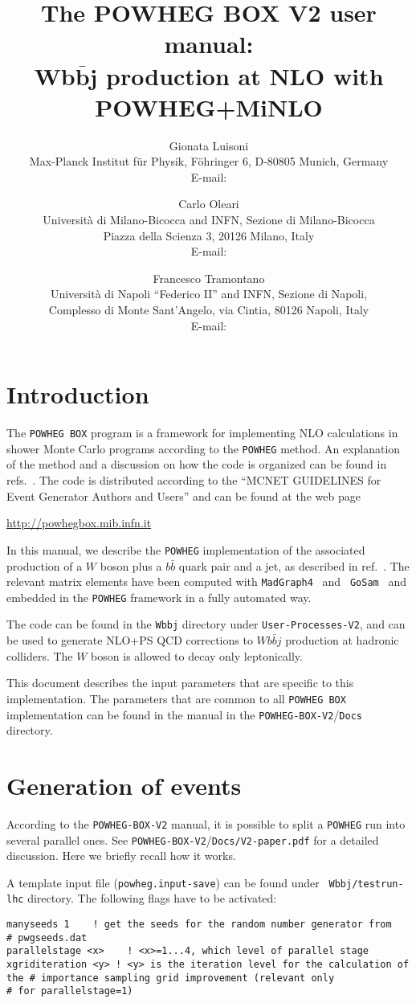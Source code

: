 \documentclass[paper]{JHEP3}
\title{The POWHEG BOX V2 user manual:\\
  $\boldsymbol{Wb\bar{b}j}$ production at NLO with POWHEG+MiNLO} \vfill
\author{Gionata Luisoni\\ 
  Max-Planck Institut f{\"u}r Physik, F\"ohringer 6, D-80805 Munich, Germany\\
  E-mail: \email{luisonig@mpp.mpg.de}
}
\author{Carlo Oleari\\
  Universit\`a di Milano-Bicocca and INFN, Sezione di Milano-Bicocca\\
  Piazza della Scienza 3, 20126 Milano, Italy\\
  E-mail: \email{carlo.oleari@mib.infn.it}}
\author{Francesco Tramontano\\
  Universit\`a di Napoli ``Federico II'' and INFN, Sezione di Napoli,\\
  Complesso di Monte Sant'Angelo, via Cintia, 80126 Napoli, Italy\\
  E-mail: \email{francesco.tramontano@na.infn.it}
}
\newcommand\POWHEG{{\tt POWHEG}}
\newcommand\POWHEGBOX{{\tt POWHEG BOX}}
\newcommand\POWHEGBOXV{{\tt POWHEG-BOX-V2}}
\newcommand\Wbbj{{\tt Wbbj}}
\begin{document}
\section{Introduction}

The \POWHEGBOX{} program is a framework for implementing NLO calculations in
shower Monte Carlo programs according to the \POWHEG{} method. An explanation
of the method and a discussion on how the code is organized can be found in
refs.~\cite{Nason:2004rx,Frixione:2007vw,Alioli:2010xd}.
The code is distributed according to the ``MCNET GUIDELINES for Event Generator Authors
and Users'' and can be found at the web page
%
\begin{center}
 \url{http://powhegbox.mib.infn.it}
\end{center}
%
In this manual, we describe the \POWHEG{} implementation of the associated
production of a $W$ boson plus a $b\bar{b}$ quark pair and a jet, as
described in ref.~\cite{Luisoni:2015mpa}. The relevant matrix elements have been
computed with {\tt MadGraph4}~\cite{Stelzer:1994ta,Alwall:2007st} and {\tt
  GoSam}~\cite{Cullen:2011ac,Cullen:2014yla} and embedded in the \POWHEG{}
framework in a fully automated way.

The code can be found in the \Wbbj{} directory under {\tt User-Processes-V2},
and can be used to generate NLO+PS QCD corrections to $Wb\bar{b}j$ production
at hadronic colliders.  The $W$ boson is allowed to decay only
leptonically.

This document describes the input parameters that are specific to this
implementation. The parameters that are common to all \POWHEGBOX{}
implementation can be found in the manual in the \POWHEGBOXV{}/{\tt Docs}
directory.


\section{Generation of events}

According to the \POWHEGBOXV{} manual, it is possible to split a \POWHEG{}
run into several parallel ones.  See \POWHEGBOXV{}/{\tt Docs/V2-paper.pdf}
for a detailed discussion. Here we briefly recall how it works.

A template input file ({\tt powheg.input-save}) can be found under {\tt
  Wbbj/testrun-lhc} directory. The following flags have to be activated:

\noindent
{\tt manyseeds 1 \qquad \quad \,\,\,! get the
  seeds for the random number generator from 
\\ \# \qquad \qquad \qquad
  \qquad \qquad pwgseeds.dat
\\ parallelstage <x> \,\,\,! <x>=1...4, which
  level of parallel stage
\\ xgriditeration <y> ! <y> is the iteration level
  for the calculation of the \# \qquad \qquad \qquad \qquad \qquad importance
  sampling grid improvement (relevant only 
\\ \# \qquad \qquad \qquad \qquad
  \qquad for parallelstage=1)}
\end{document}
